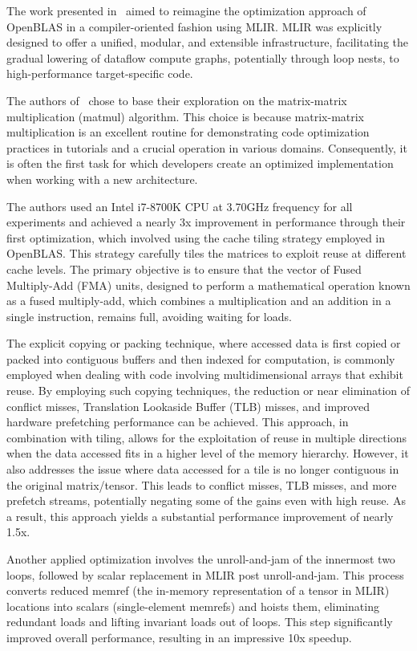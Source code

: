The work presented in~\cite{DBLP:journals/corr/abs-2003-00532} aimed to reimagine the optimization approach of OpenBLAS in a compiler-oriented fashion using MLIR.
MLIR was explicitly designed to offer a unified, modular, and extensible infrastructure, facilitating the gradual lowering of dataflow compute graphs, potentially through loop nests, to high-performance target-specific code.

The authors of~\cite{DBLP:journals/corr/abs-2003-00532} chose to base their exploration on the matrix-matrix multiplication (matmul) algorithm.
This choice is because matrix-matrix multiplication is an excellent routine for demonstrating code optimization practices in tutorials and a crucial operation in various domains.
Consequently, it is often the first task for which developers create an optimized implementation when working with a new architecture.

The authors used an Intel i7-8700K CPU at 3.70GHz frequency for all experiments and achieved a nearly 3x improvement in performance through their first optimization, which involved using the cache tiling strategy employed in OpenBLAS\@.
This strategy carefully tiles the matrices to exploit reuse at different cache levels.
The primary objective is to ensure that the vector of Fused Multiply-Add (FMA) units, designed to perform a mathematical operation known as a fused multiply-add, which combines a multiplication and an addition in a single instruction, remains full, avoiding waiting for loads.

The explicit copying or packing technique, where accessed data is first copied or packed into contiguous buffers and then indexed for computation, is commonly employed when dealing with code involving multidimensional arrays that exhibit reuse.
By employing such copying techniques, the reduction or near elimination of conflict misses, Translation Lookaside Buffer (TLB) misses, and improved hardware prefetching performance can be achieved.
This approach, in combination with tiling, allows for the exploitation of reuse in multiple directions when the data accessed fits in a higher level of the memory hierarchy.
However, it also addresses the issue where data accessed for a tile is no longer contiguous in the original matrix/tensor.
This leads to conflict misses, TLB misses, and more prefetch streams, potentially negating some of the gains even with high reuse.
As a result, this approach yields a substantial performance improvement of nearly 1.5x.

Another applied optimization involves the unroll-and-jam of the innermost two loops, followed by scalar replacement in MLIR post unroll-and-jam.
This process converts reduced memref (the in-memory representation of a tensor in MLIR) locations into scalars (single-element memrefs) and hoists them, eliminating redundant loads and lifting invariant loads out of loops.
This step significantly improved overall performance, resulting in an impressive 10x speedup.


